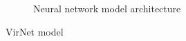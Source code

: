 \begin{figure}[!htbp]
\begin{subfigure}{0.5\textwidth}
		\caption{Neural network model architecture} 
		\label{fig:model_diagram}
	\end{subfigure}
	\caption{VirNet model} 
	\label{fig:model_arch}
\end{figure}

